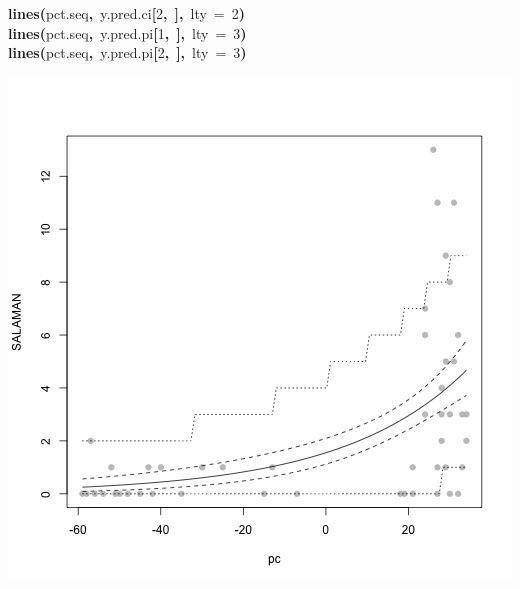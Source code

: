 \documentclass{article}
\makeatletter
\newcommand{\hlnumber}[1]{\textcolor[rgb]{0,0,0}{#1}}%
\newcommand{\hlfunctioncall}[1]{\textcolor[rgb]{.5,0,.33}{\textbf{#1}}}%
\newcommand{\hlkeyword}[1]{\textbf{#1}}%
\newcommand{\hlargument}[1]{\textcolor[rgb]{.69,.25,.02}{#1}}%
\newcommand{\hlsymbol}[1]{#1}%
\newcommand{\hlstd}[1]{\textcolor[rgb]{0,0,0}{#1}}%
\newenvironment{kframe}{%
 \def\FrameCommand##1{\hskip\@totalleftmargin \hskip-\fboxsep
 \colorbox{shadecolor}{##1}\hskip-\fboxsep
     \hskip-\linewidth \hskip-\@totalleftmargin \hskip\columnwidth}%
 \MakeFramed {\advance\hsize-\width
   \@totalleftmargin\z@ \linewidth\hsize
   \@setminipage}}%
 {\par\unskip\endMakeFramed}
\newenvironment{knitrout}{}{} %
\makeatother
\begin{document}
\begin{knitrout}
{\begin{kframe}
\begin{flushleft}
\hlstd{}\hlfunctioncall{lines}\hlkeyword{(}\hlsymbol{pct.seq}\hlkeyword{,}{\ }\hlsymbol{y.pred.ci}\hlkeyword{[}\hlnumber{2}\hlkeyword{,}{\ }\hlkeyword{]}\hlkeyword{,}{\ }\hlargument{lty}{\ }\hlargument{=}{\ }\hlnumber{2}\hlkeyword{)}\hspace*{\fill}\\
\hlstd{}\hlfunctioncall{lines}\hlkeyword{(}\hlsymbol{pct.seq}\hlkeyword{,}{\ }\hlsymbol{y.pred.pi}\hlkeyword{[}\hlnumber{1}\hlkeyword{,}{\ }\hlkeyword{]}\hlkeyword{,}{\ }\hlargument{lty}{\ }\hlargument{=}{\ }\hlnumber{3}\hlkeyword{)}\hspace*{\fill}\\
\hlstd{}\hlfunctioncall{lines}\hlkeyword{(}\hlsymbol{pct.seq}\hlkeyword{,}{\ }\hlsymbol{y.pred.pi}\hlkeyword{[}\hlnumber{2}\hlkeyword{,}{\ }\hlkeyword{]}\hlkeyword{,}{\ }\hlargument{lty}{\ }\hlargument{=}{\ }\hlnumber{3}\hlkeyword{)}\mbox{}
\normalfont
\end{flushleft}
\includegraphics{2b-avg} \end{kframe}}
\end{knitrout}
\end{document}
